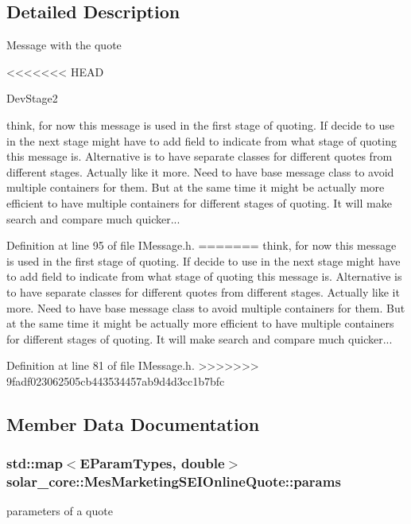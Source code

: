 \subsection{Detailed Description}
Message with the quote

<<<<<<< HEAD
\begin{DoxyRefDesc}{Dev\+Stage2}
\item[\hyperlink{_dev_stage2__DevStage2000025}{Dev\+Stage2}]think, for now this message is used in the first stage of quoting. If decide to use in the next stage might have to add field to indicate from what stage of quoting this message is. Alternative is to have separate classes for different quotes from different stages. Actually like it more. Need to have base message class to avoid multiple containers for them. But at the same time it might be actually more efficient to have multiple containers for different stages of quoting. It will make search and compare much quicker...\end{DoxyRefDesc}


Definition at line 95 of file I\+Message.\+h.
=======
think, for now this message is used in the first stage of quoting. If decide to use in the next stage might have to add field to indicate from what stage of quoting this message is. Alternative is to have separate classes for different quotes from different stages. Actually like it more. Need to have base message class to avoid multiple containers for them. But at the same time it might be actually more efficient to have multiple containers for different stages of quoting. It will make search and compare much quicker... 

Definition at line 81 of file I\+Message.\+h.
>>>>>>> 9fadf023062505cb443534457ab9d4d3cc1b7bfc



\subsection{Member Data Documentation}
\hypertarget{classsolar__core_1_1_mes_marketing_s_e_i_online_quote_a985cbf3eb866c4488f0de003c4090aaf}{}
\subsubsection[{params}]{\setlength{\rightskip}{0pt plus 5cm}std\+::map$<${\bf E\+Param\+Types}, double$>$ solar\+\_\+core\+::\+Mes\+Marketing\+S\+E\+I\+Online\+Quote\+::params}\label{classsolar__core_1_1_mes_marketing_s_e_i_online_quote_a985cbf3eb866c4488f0de003c4090aaf}
parameters of a quote 

